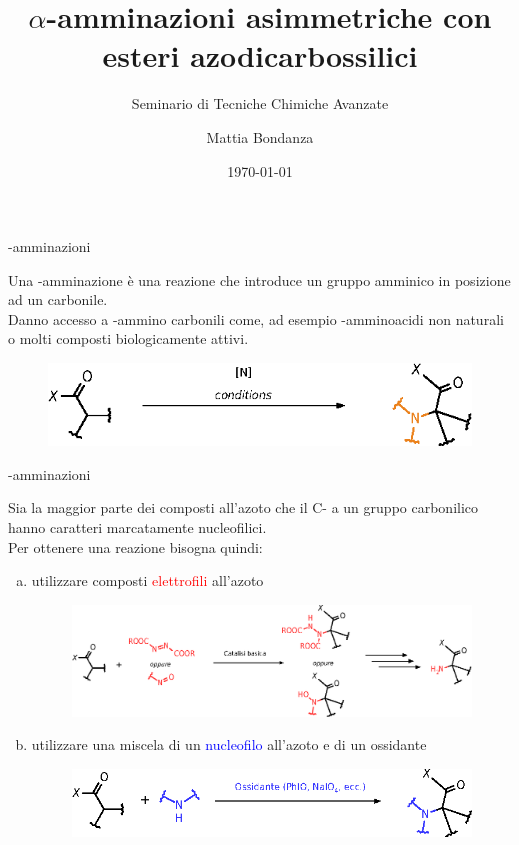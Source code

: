 \documentclass[10pt]{beamer}
\title{$\alpha$-amminazioni asimmetriche con esteri azodicarbossilici}
\subtitle{Seminario di Tecniche Chimiche Avanzate}
\date{\today}
\author{Mattia Bondanza}
\institute{Università di Pisa}
\begin{document}
\maketitle

\begin{frame}[fragile]{{\textalpha}-amminazioni}

  Una {\textalpha}-amminazione è una reazione che introduce un gruppo amminico in posizione {\textalpha} ad un \alert{carbonile}.\\
  Danno accesso a {\textalpha}-ammino carbonili come, ad esempio \alert{{\textalpha}-amminoacidi non naturali} o molti composti \alert{biologicamente attivi}. 

  \begin{figure}[H]  	
  	\centering
  	\includegraphics[scale=0.7]{P_general_amination.eps}
  \end{figure}  

\end{frame}

\begin{frame}[fragile]{{\textalpha}-amminazioni}

Sia la maggior parte dei composti all'azoto che il C-{\textalpha} a un gruppo carbonilico hanno caratteri marcatamente nucleofilici.\\
Per ottenere una reazione bisogna quindi:
\begin{enumerate}[(a)]
	\item utilizzare composti \textcolor{red}{elettrofili} all'azoto
	\begin{figure}[H]  	
		\centering
		\includegraphics[scale=0.7]{P_electrophile_amination.eps}
	\end{figure}  
	\item utilizzare una miscela di un \textcolor{blue}{nucleofilo} all'azoto e di un ossidante  
	\begin{figure}[H]  	
		\centering
		\includegraphics[scale=0.7]{P_nucleophile_amination.eps}
	\end{figure}  
\end{enumerate} 
\end{frame}
\end{document}
